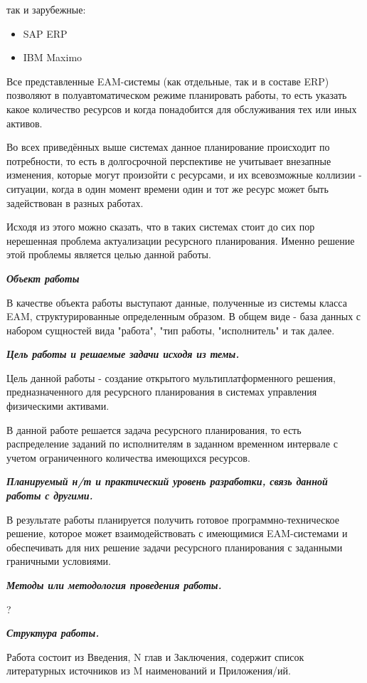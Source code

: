 так и зарубежные:

\begin{itemize}
	\item SAP ERP
	\item IBM Maximo
\end{itemize}

Все представленные EAM-системы (как отдельные, так и в составе ERP) позволяют в полуавтоматическом режиме планировать работы, то есть указать какое количество ресурсов и когда понадобится для обслуживания тех или иных активов.

Во всех приведённых выше системах данное планирование происходит по потребности, то есть в долгосрочной перспективе не учитывает внезапные изменения, которые могут произойти с ресурсами, и их всевозможные коллизии - ситуации, когда в один момент времени один и тот же ресурс может быть задействован в разных работах.

Исходя из этого можно сказать, что в таких системах стоит до сих пор нерешенная проблема актуализации ресурсного планирования. Именно решение этой проблемы является целью данной работы.

\textbf{\textit{Объект работы}}

В качестве объекта работы выступают данные, полученные из системы класса EAM, структурированные определенным образом. В общем виде - база данных с набором сущностей вида "работа", "тип работы, "исполнитель" и так далее.

\textbf{\textit{Цель работы и решаемые задачи исходя из темы.}}

Цель данной работы - создание открытого мультиплатформенного решения, предназначенного для ресурсного планирования в системах управления физическими активами.

В данной работе решается задача ресурсного планирования, то есть распределение заданий по исполнителям в заданном временном интервале с учетом ограниченного количества имеющихся ресурсов.

\textbf{\textit{Планируемый н/т и практический уровень разработки, связь данной
	работы с другими.}}

В результате работы планируется получить готовое программно-техническое решение, которое может взаимодействовать с имеющимися EAM-системами и обеспечивать для них решение задачи ресурсного планирования с заданными граничными условиями.

\textbf{\textit{Методы или методология проведения работы.}}

?

\textbf{\textit{Структура работы.}}

Работа состоит из Введения, N глав и Заключения, содержит список литературных источников из M наименований и Приложения/ий.

\clearpage
